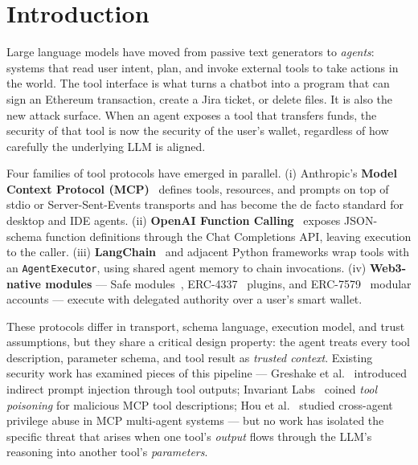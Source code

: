 \documentclass[conference]{IEEEtran}
\begin{document}
\section{Introduction}
\label{sec:intro}

Large language models have moved from passive text generators to
\textit{agents}: systems that read user intent, plan, and invoke
external tools to take actions in the world.  The tool interface is
what turns a chatbot into a program that can sign an Ethereum
transaction, create a Jira ticket, or delete files.  It is also the
new attack surface.  When an agent exposes a tool that transfers
funds, the security of that tool is now the security of the user's
wallet, regardless of how carefully the underlying LLM is aligned.

Four families of tool protocols have emerged in parallel.  (i)
Anthropic's \textbf{Model Context Protocol (MCP)}~\cite{anthropic2024mcp}
defines tools, resources, and prompts on top of stdio or
Server-Sent-Events transports and has become the de facto standard for
desktop and IDE agents.  (ii) \textbf{OpenAI Function
Calling}~\cite{openai2023funccall} exposes JSON-schema function
definitions through the Chat Completions API, leaving execution to the
caller.  (iii) \textbf{LangChain}~\cite{langchain2024tools} and
adjacent Python frameworks wrap tools with an \texttt{AgentExecutor},
using shared agent memory to chain invocations.  (iv)
\textbf{Web3-native modules} --- Safe modules~\cite{safe2023modules},
ERC-4337~\cite{erc4337} plugins, and ERC-7579~\cite{erc7579} modular
accounts --- execute with delegated authority over a user's smart
wallet.

These protocols differ in transport, schema language, execution model,
and trust assumptions, but they share a critical design property: the
agent treats every tool description, parameter schema, and tool result
as \emph{trusted context}.  Existing security work has examined pieces
of this pipeline --- Greshake et al.~\cite{greshake2023injection}
introduced indirect prompt injection through tool outputs; Invariant
Labs~\cite{invariantlabs2025mcp} coined \emph{tool poisoning} for
malicious MCP tool descriptions; Hou et al.~\cite{hou2025mcp} studied
cross-agent privilege abuse in MCP multi-agent systems --- but no work
has isolated the specific threat that arises when one tool's
\emph{output} flows through the LLM's reasoning into another tool's
\emph{parameters}.
\end{document}
